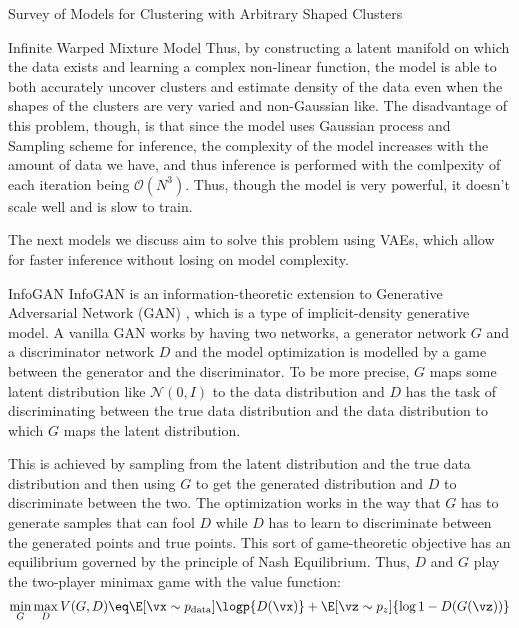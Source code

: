 \documentclass{article}
\begin{document}
\begin{psection}{Survey of Models for Clustering with Arbitrary Shaped Clusters}
\begin{psubsection}{Infinite Warped Mixture Model}
		Thus, by constructing a latent manifold on which the data exists and learning a complex non-linear function, the model is able to both accurately uncover clusters and estimate density of the data even when the shapes of the clusters are very varied and non-Gaussian like. The disadvantage of this problem, though, is that since the model uses Gaussian process and Sampling scheme for inference, the complexity of the model increases with the amount of data we have, and thus inference is performed with the comlpexity of each iteration being $\mathcal{O}(N^3)$. Thus, though the model is very powerful, it doesn't scale well and is slow to train.

		The next models we discuss aim to solve this problem using VAEs, which allow for faster inference without losing on model complexity.

	\end{psubsection}

	\begin{psubsection}{InfoGAN}
		InfoGAN \citep{chen2016infogan} is an information-theoretic extension to Generative Adversarial Network (GAN) \citep{goodfellow2014generative}, which is a type of implicit-density generative model. A vanilla GAN works by having two networks, a generator network $G$ and a discriminator network $D$ and the model optimization is modelled by a game between the generator and the discriminator. To be more precise, $G$ maps some latent distribution like $\mathcal{N}(0,I)$ to the data distribution and $D$ has the task of discriminating between the true data distribution and the data distribution to which $G$ maps the latent distribution.

		This is achieved by sampling from the latent distribution and the true data distribution and then using $G$ to get the generated distribution and $D$ to discriminate between the two. The optimization works in the way that $G$ has to generate samples that can fool $D$ while $D$ has to learn to discriminate between the generated points and true points. This sort of game-theoretic objective has an equilibrium governed by the principle of Nash Equilibrium. Thus, $D$ and $G$ play the two-player minimax game with the value function:
		\begin{align*}
			\min_G \max_D V(G, D) \eq \E[\vx \sim p_{\text{data}}]{\logp{D(\vx)} + \E[\vz \sim p_z]{\log{1 - D(G(\vz))}}}
		\end{align*}


\end{psubsection}
\end{psection}
\end{document}
